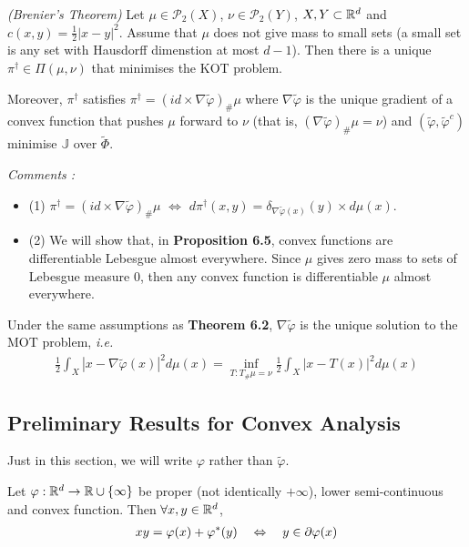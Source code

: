 \documentclass[10pt,a4paper]{article}
\renewenvironment{i}
{\begin{itemize} 
	}%
	{\end{itemize}
}
\begin{document}
\s

 \emph{(Brenier's Theorem)} Let $\mu \in \mathscr{P}_2(X)$, $\nu \in \mathscr{P}_2(Y)$, $X, Y\subset \mathbb{R}^d$ and $c(x,y) = \frac{1}{2} |x-y|^2$. Assume that $\mu$ does not give mass to small sets (a small set is any set with Hausdorff dimenstion at most $d-1$). Then there is a unique $\pi^{\dagger} \in \Pi(\mu, \nu)$ that minimises the KOT problem.

\quad Moreover, $\pi^{\dagger}$ satisfies $\pi^{\dagger} = (id \times \nabla \tilde{\varphi})_{\#} \mu$ where $\nabla \tilde{\varphi}$ is the unique gradient of a convex function that pushes $\mu$ forward to $\nu$ (that is, $(\nabla \tilde{\varphi})_{\#} \mu = \nu$) and $(\tilde{\varphi},\tilde{\varphi}^c)$ minimise $\mathbb{J}$ over $\tilde{\Phi}$.
\s

\emph{Comments :}
\begin{i}
\item[(1)] $\pi^{\dagger} = (id \times \nabla \tilde{\varphi})_{\#} \mu$ $\Leftrightarrow$ $d\pi^{\dagger}(x,y) = \delta_{\nabla \tilde{\varphi}(x)}(y) \times d\mu(x)$.
\item[(2)] We will show that, in \textbf{Proposition 6.5}, convex functions are differentiable Lebesgue almost everywhere. Since $\mu$ gives zero mass to sets of Lebesgue measure 0, then any convex function is differentiable $\mu$ almost everywhere.
\end{i}
\s

 Under the same assumptions as \textbf{Theorem 6.2}, $\nabla \tilde{\varphi}$ is the unique solution to the MOT problem, \textit{i.e.}
\begin{align*}
\frac{1}{2} \int_X |x- \nabla \tilde{\varphi}(x)|^2 d\mu(x) = \inf_{T: T_{\#}\mu = \nu} \frac{1}{2} \int_X |x- T(x)|^2 d\mu(x)
\end{align*}

\subsection{Preliminary Results for Convex Analysis}

Just in this section, we will write $\varphi$ rather than $\tilde{\varphi}$.
\s

 Let $\varphi : \mathbb{R}^d \rightarrow \mathbb{R}\cup \{\infty\}$ be proper (not identically $+ \infty$), lower semi-continuous and convex function. Then $\forall x, y\in \mathbb{R}^d$, 
\begin{align*}
xy = \varphi(x) + \varphi^*(y) \quad \Leftrightarrow \quad y\in \partial \varphi(x)
\end{align*}
\s
\end{document}
